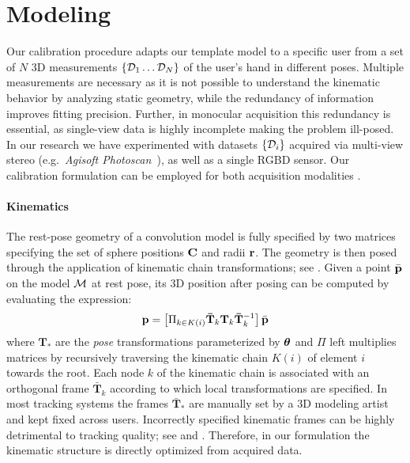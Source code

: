 
\section{Modeling}
\label{sec:modeling}

Our calibration procedure adapts our template model to a specific user from a set of $N$ 3D measurements $\{ \mathcal{D}_1 \dots \mathcal{D}_N \}$ of the user's hand in different poses. Multiple measurements are necessary as it is not possible to understand the kinematic behavior by analyzing static geometry, while the redundancy of information improves fitting precision. Further, in  monocular acquisition this redundancy is essential, as single-view data is highly incomplete making the problem ill-posed. In our research we have experimented with datasets $\{\mathcal{D}_i\}$ acquired via  multi-view stereo (e.g.\ \emph{Agisoft Photoscan~\textcopyright}), as well as a single RGBD sensor. Our calibration formulation can be employed for both acquisition modalities .


\paragraph{Kinematics}
The rest-pose geometry of a convolution model is fully specified by two matrices specifying the set of sphere positions ${\mathbf{C}}$ and radii ${\mathbf{r}}$. The geometry is then posed through the application of  kinematic chain transformations; see . Given a point $\bar{\mathbf{p}}$ on the model $\mathcal{M}$ at rest pose, its 3D position after posing can be computed by evaluating the expression:
% 
\begin{equation}
\mathbf{p} = \left[ \Pi_{k \in K(i)} \mathbf{\bar{T}}_k \mathbf{T}_k \mathbf{\bar{T}}_k^{-1} \right] \bar{\mathbf{p}}
\label{eq:kinematic}
\end{equation}
%
where $\mathbf{T}_*$ are the \emph{pose} transformations parameterized by $\boldsymbol{\theta}$ and $\Pi$ left multiplies matrices by recursively traversing the kinematic chain $K(i)$ of element $i$ towards the root. Each node $k$ of the kinematic chain is associated with an orthogonal frame $\mathbf{\bar{T}}_k$ according to which local transformations are specified. In most tracking systems the frames $\mathbf{\bar{T}}_*$ are manually set by a 3D modeling artist and kept fixed across users. Incorrectly specified kinematic frames can be highly detrimental to tracking quality; see  and . Therefore, in our formulation the kinematic structure is directly optimized from acquired data.

